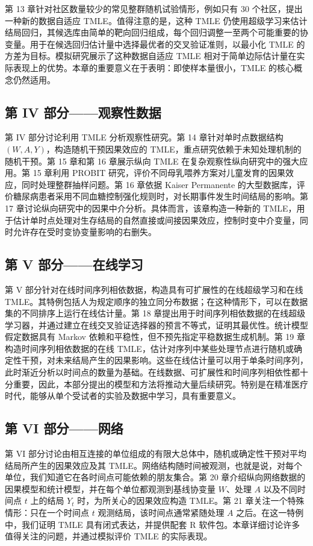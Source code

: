 第 13 章针对社区数量较少的常见整群随机试验情形，例如只有 30 个社区，提出一种新的数据自适应 TMLE。值得注意的是，这种 TMLE 仍使用超级学习来估计结局回归，其候选库由简单的靶向回归组成，每个回归调整一至两个可能重要的协变量。用于在候选回归估计量中选择最优者的交叉验证准则，以最小化 TMLE 的方差为目标。模拟研究展示了这种数据自适应 TMLE 相对于简单边际估计量在实际表现上的优势。本章的重要意义在于表明：即使样本量很小，TMLE 的核心概念仍然适用。

\subsection*{第 IV 部分——观察性数据}

第 IV 部分讨论利用 TMLE 分析观察性研究。第 14 章针对单时点数据结构 $(W,A,Y)$，构造随机干预因果效应的 TMLE，重点研究依赖于未知处理机制的随机干预。第 15 章和第 16 章展示纵向 TMLE 在复杂观察性纵向研究中的强大应用。第 15 章利用 PROBIT 研究，评价不同母乳喂养方案对儿童发育的因果效应，同时处理整群抽样问题。第 16 章依据 Kaiser Permanente 的大型数据库，评价糖尿病患者采用不同血糖控制强化规则时，对长期事件发生时间结局的影响。第 17 章讨论纵向研究中的因果中介分析。具体而言，该章构造一种新的 TMLE，用于估计单时点处理对生存结局的自然直接或间接因果效应，控制时变中介变量，同时允许存在受时变协变量影响的右删失。

\subsection*{第 V 部分——在线学习}

第 V 部分针对在线时间序列相依数据，构造具有可扩展性的在线超级学习和在线 TMLE。其特例包括人为规定顺序的独立同分布数据；在这种情形下，可以在数据集的不同排序上运行在线估计量。第 18 章提出用于时间序列相依数据的在线超级学习器，并通过建立在线交叉验证选择器的预言不等式，证明其最优性。统计模型假定数据具有 Markov 依赖和平稳性，但不预先指定平稳数据生成机制。第 19 章构造时间序列相依数据的在线 TMLE，估计对序列中某些处理节点进行随机或确定性干预，对未来结局产生的因果影响。这些在线估计量可以用于单条时间序列，此时渐近分析以时间点的数量为基础。在线数据、可扩展性和时间序列相依性都十分重要，因此，本部分提出的模型和方法将推动大量后续研究。特别是在精准医疗时代，能够从单个受试者的实验及数据中学习，具有重要意义。

\subsection*{第 VI 部分——网络}

第 VI 部分讨论由相互连接的单位组成的有限大总体中，随机或确定性干预对平均结局所产生的因果效应及其 TMLE。网络结构随时间被观测，也就是说，对每个单位，我们知道它在各时间点可能依赖的朋友集合。第 20 章介绍纵向网络数据的因果模型和统计模型，并在每个单位都观测到基线协变量 $W$、处理 $A$ 以及不同时间点 $t$ 上的结局 $Y_t$ 时，为所关心的因果效应构造 TMLE。第 21 章关注一个特殊情形：只在一个时间点 $t$ 观测结局，该时间点通常紧随处理 $A$ 之后。在这一特例中，我们证明 TMLE 具有闭式表达，并提供配套 R 软件包。本章详细讨论许多值得关注的问题，并通过模拟评价 TMLE 的实际表现。


